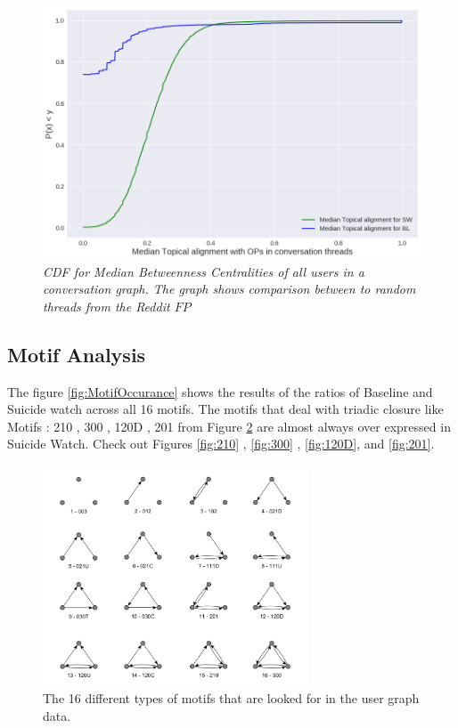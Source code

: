 \begin{figure}[!h]
	\centering
	\includegraphics[width=0.5\columnwidth]{Figures/topicalAlignment.png}
	\caption{\textsl{ CDF for Median Betweenness Centralities of all users in a conversation graph. The graph shows comparison between  to random threads from the Reddit $FP$ }}
	\label{fig:TopicalAlignment}
\end{figure}


\subsection{Motif Analysis}

The figure \ref{fig:MotifOccurance} shows the results of the ratios of Baseline and Suicide watch across all 16 motifs. The motifs that deal with triadic closure like Motifs : 210 , 300 , 120D , 201 from Figure \ref{fig:motifs} are almost always over expressed in Suicide Watch. Check out Figures \ref{fig:210} , \ref{fig:300} , \ref{fig:120D}, and \ref{fig:201}. 


\begin{figure}[!ht]
	\centering
	\includegraphics[width=0.7\textwidth]{Figures/TriadVariants}
	\caption{The 16 different types of motifs that are looked for in the user graph data.}
	\label{fig:motifs}
\end{figure}

